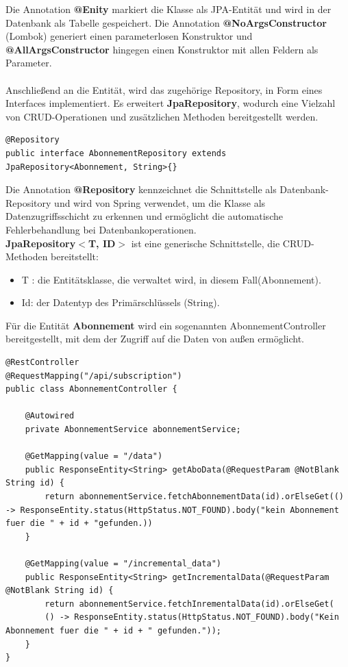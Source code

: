 \documentclass[a4paper,12pt]{scrreprt}
\begin{document}
	Die Annotation \textbf{@Enity} markiert die Klasse als JPA-Entität und wird in der Datenbank als Tabelle gespeichert. Die Annotation \textbf{@NoArgsConstructor} (Lombok) generiert einen parameterlosen Konstruktor und \textbf{@AllArgsConstructor} hingegen einen Konstruktor mit allen Feldern als Parameter.\\ \\
	Anschließend an die Entität, wird das zugehörige Repository, in Form eines Interfaces implementiert. Es erweitert \textbf{JpaRepository}, wodurch eine Vielzahl von CRUD-Operationen und zusätzlichen Methoden bereitgestellt werden.
\begin{lstlisting}
@Repository
public interface AbonnementRepository extends JpaRepository<Abonnement, String>{}
\end{lstlisting}
	Die Annotation \textbf{@Repository} kennzeichnet die Schnittstelle als Datenbank-Repository und wird von Spring verwendet, um die Klasse als Datenzugriffsschicht zu erkennen und ermöglicht die automatische Fehlerbehandlung bei Datenbankoperationen.\\
	\textbf{JpaRepository$<$T, ID$>$} ist eine generische Schnittstelle, die CRUD-Methoden bereitstellt:
	\begin{itemize}
		\item T : die Entitätsklasse, die verwaltet wird, in diesem Fall(Abonnement).
		\item Id: der Datentyp des Primärschlüssels (String).
	\end{itemize}
	\vspace{1cm}
	Für die Entität \textbf{Abonnement} wird ein sogenannten AbonnementController bereitgestellt, mit dem der Zugriff auf die Daten von außen ermöglicht.
\begin{lstlisting}
@RestController
@RequestMapping("/api/subscription")
public class AbonnementController {
	
	@Autowired
	private AbonnementService abonnementService;
			
	@GetMapping(value = "/data")
	public ResponseEntity<String> getAboData(@RequestParam @NotBlank String id) {
		return abonnementService.fetchAbonnementData(id).orElseGet(() -> ResponseEntity.status(HttpStatus.NOT_FOUND).body("kein Abonnement fuer die " + id + "gefunden.))
	}
			
	@GetMapping(value = "/incremental_data")
	public ResponseEntity<String> getIncrementalData(@RequestParam @NotBlank String id) {
		return abonnementService.fetchInrementalData(id).orElseGet(
		() -> ResponseEntity.status(HttpStatus.NOT_FOUND).body("Kein Abonnement fuer die " + id + " gefunden."));
	}
}
\end{lstlisting}
\end{document}
